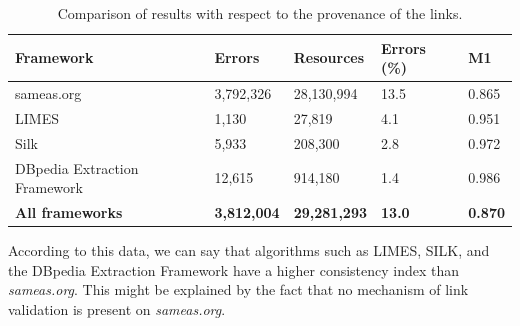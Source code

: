 \begin{table}[htb]
\centering
\caption{Comparison of results with respect to the provenance of the links.}
\label{tab:frameworks}
\begin{tabular}{@{}lllll@{}}
\toprule
\textbf{Framework}                          & \textbf{Errors} & \textbf{Resources} & \textbf{Errors (\%)} & \textbf{M1} \\ \midrule
sameas.org                                  & 3,792,326         & 28,130,994       & 13.5 &  0.865           \\
LIMES                                       & 1,130            & 27,819            & 4.1  &  0.951             \\
Silk                                        & 5,933            & 208,300           & 2.8  &  0.972             \\
DBpedia Extraction Framework                & 12,615          &  914,180           & 1.4  &  0.986    \\ \midrule
\textbf{All frameworks} & \textbf{3,812,004} & \textbf{29,281,293} & \textbf{13.0} & \textbf{0.870} \\ \bottomrule
\end{tabular}
\end{table}
%
According to this data, we can say that algorithms such as LIMES, SILK, and the DBpedia Extraction Framework have a higher consistency index than \textit{sameas.org}. This might be explained by the fact that no mechanism of link validation is present on \textit{sameas.org}.
 


